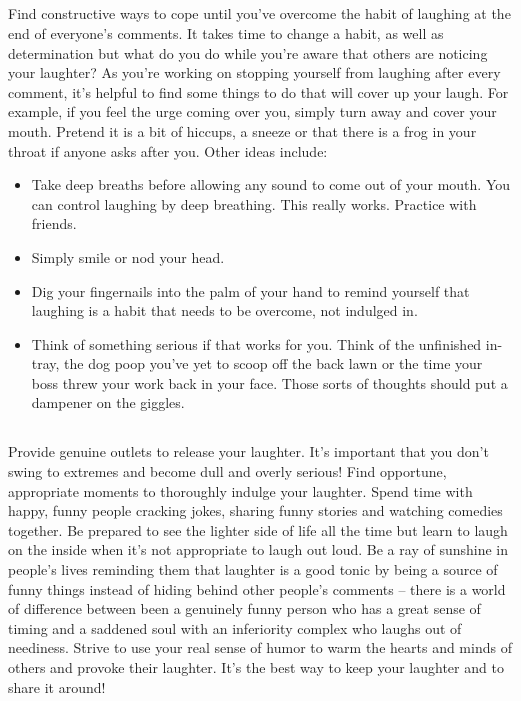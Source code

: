 \documentclass{article}
\begin{document}
\subsection{}
Find constructive ways to cope until you've overcome the habit of laughing at the end of everyone's comments. It takes time to change a habit, as well as determination but what do you do while you're aware that others are noticing your laughter? As you're working on stopping yourself from laughing after every comment, it's helpful to find some things to do that will cover up your laugh. For example, if you feel the urge coming over you, simply turn away and cover your mouth. Pretend it is a bit of hiccups, a sneeze or that there is a frog in your throat if anyone asks after you. Other ideas include:
\begin{itemize}
\item{Take deep breaths before allowing any sound to come out of your mouth. You can control laughing by deep breathing. This really works. Practice with friends.}
\item{Simply smile or nod your head.}
\item{Dig your fingernails into the palm of your hand to remind yourself that laughing is a habit that needs to be overcome, not indulged in.}
\item{Think of something serious if that works for you. Think of the unfinished in-tray, the dog poop you've yet to scoop off the back lawn or the time your boss threw your work back in your face. Those sorts of thoughts should put a dampener on the giggles.}
\end{itemize}

\subsection{}
Provide genuine outlets to release your laughter. It's important that you don't swing to extremes and become dull and overly serious! Find opportune, appropriate moments to thoroughly indulge your laughter. Spend time with happy, funny people cracking jokes, sharing funny stories and watching comedies together. Be prepared to see the lighter side of life all the time but learn to laugh on the inside when it's not appropriate to laugh out loud. Be a ray of sunshine in people's lives reminding them that laughter is a good tonic by being a source of funny things instead of hiding behind other people's comments – there is a world of difference between been a genuinely funny person who has a great sense of timing and a saddened soul with an inferiority complex who laughs out of neediness. Strive to use your real sense of humor to warm the hearts and minds of others and provoke their laughter. It's the best way to keep your laughter and to share it around!
\end{document}
